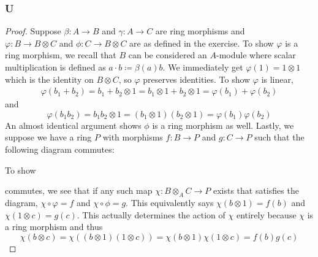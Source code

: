 \documentclass{article}
\begin{document}
\subsubsection{U}\label{1.3.U}
\begin{proof}
    Suppose $\beta:A\to B$ and $\gamma:A\to C$ are ring morphisms and \\$\varphi:B\to B\otimes C$ and $\phi:C\to B\otimes C$ are as defined in the exercise. To show $\varphi$ is a ring morphism, we recall that $B$ can be considered an $A$-module where scalar multiplication is defined as $a\cdot b\coloneqq \beta(a) b$. We immediately get $\varphi(1)=1\otimes 1$ which is the identity on $B\otimes C$, so $\varphi$ preserves identities. To show $\varphi$ is linear,
    \begin{align*}
        \varphi(b_1+b_2)=b_1+b_2\otimes 1=b_1\otimes 1+b_2\otimes1=\varphi(b_1)+\varphi(b_2)
    \end{align*}
    and
    \[
    \varphi(b_1b_2)=b_1b_2\otimes 1=(b_1\otimes 1)(b_2\otimes 1)=\varphi(b_1)\varphi(b_2)
    \]
    An almost identical argument shows $\phi$ is a ring morphism as well. Lastly, we suppose we have a ring $P$ with morphisms $f:B\to P$ and $g:C\to P$ such that the following diagram commutes:
    \begin{center}
    \end{center}
    To show
    \begin{center}
    \end{center}
    commutes, we see that if any such map $\chi:B\otimes_A C\to P$ exists that satisfies the diagram, $\chi \circ \varphi=f$ and $\chi\circ \phi=g$. This equivalently says $\chi(b\otimes 1)=f(b)$ and $\chi(1\otimes c)=g(c)$. This actually determines the action of $\chi$ entirely because $\chi$ is a ring morphism and thus
    \[
    \chi(b\otimes c)=\chi((b\otimes 1)(1\otimes c))=\chi(b\otimes 1)\chi(1\otimes c)=f(b)g(c)
\]
\end{proof}
\end{document}
